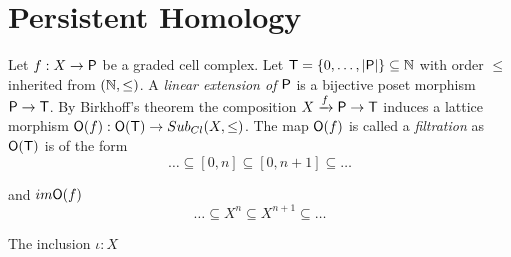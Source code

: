 
\section{Persistent Homology}\label{sec:PH}

Let $f:X\to {\mathsf P}$ be a graded cell complex.  Let ${\mathsf T}=\{0,\ldots, |{\mathsf P}|\}\subseteq {\mathbb{N}}$ with order $\leq$ inherited from $({\mathbb{N}},\leq)$.  A {\em linear extension of ${\mathsf P}$} is a bijective poset morphism ${\mathsf P}\to {\mathsf T}$.  By Birkhoff's theorem the composition $X\xrightarrow{f}{\mathsf P}\to {\mathsf T}$ induces a lattice morphism ${\mathsf O}(f):{\mathsf O}({\mathsf T})\to Sub_{Cl}(X,\leq)$.  The map ${\mathsf O}(f)$ is called a {\em filtration} as ${\mathsf O}({\mathsf T})$ is of the form
\[
\ldots \subseteq [0,n] \subseteq [0,n+1]\subseteq \ldots
\]

and $im{\mathsf O}(f)$ 
\[
\ldots \subseteq X^n \subseteq X^{n+1}\subseteq \ldots
\]

The inclusion $\iota:X$